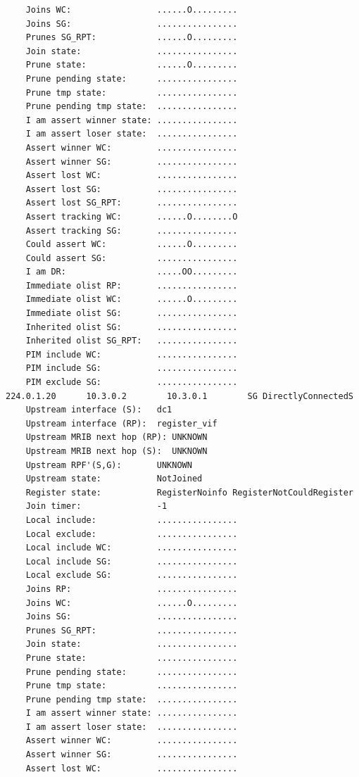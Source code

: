 \documentclass[11pt]{report}
\begin{document}
\begin{itemize}
\begin{verbatim}
    Joins WC:                 ......O.........
    Joins SG:                 ................
    Prunes SG_RPT:            ......O.........
    Join state:               ................
    Prune state:              ......O.........
    Prune pending state:      ................
    Prune tmp state:          ................
    Prune pending tmp state:  ................
    I am assert winner state: ................
    I am assert loser state:  ................
    Assert winner WC:         ................
    Assert winner SG:         ................
    Assert lost WC:           ................
    Assert lost SG:           ................
    Assert lost SG_RPT:       ................
    Assert tracking WC:       ......O........O
    Assert tracking SG:       ................
    Could assert WC:          ......O.........
    Could assert SG:          ................
    I am DR:                  .....OO.........
    Immediate olist RP:       ................
    Immediate olist WC:       ......O.........
    Immediate olist SG:       ................
    Inherited olist SG:       ................
    Inherited olist SG_RPT:   ................
    PIM include WC:           ................
    PIM include SG:           ................
    PIM exclude SG:           ................
224.0.1.20      10.3.0.2        10.3.0.1        SG DirectlyConnectedS 
    Upstream interface (S):   dc1
    Upstream interface (RP):  register_vif
    Upstream MRIB next hop (RP): UNKNOWN
    Upstream MRIB next hop (S):  UNKNOWN
    Upstream RPF'(S,G):       UNKNOWN
    Upstream state:           NotJoined 
    Register state:           RegisterNoinfo RegisterNotCouldRegister 
    Join timer:               -1
    Local include:            ................
    Local exclude:            ................
    Local include WC:         ................
    Local include SG:         ................
    Local exclude SG:         ................
    Joins RP:                 ................
    Joins WC:                 ......O.........
    Joins SG:                 ................
    Prunes SG_RPT:            ................
    Join state:               ................
    Prune state:              ................
    Prune pending state:      ................
    Prune tmp state:          ................
    Prune pending tmp state:  ................
    I am assert winner state: ................
    I am assert loser state:  ................
    Assert winner WC:         ................
    Assert winner SG:         ................
    Assert lost WC:           ................

\end{verbatim}
\end{itemize}
\end{document}
